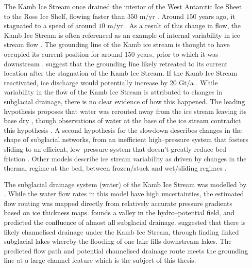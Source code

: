 The  Kamb Ice Stream  once  drained  the  interior  of  the  West  Antarctic  Ice  Sheet  to  the Ross Ice Shelf, flowing faster than $350$ $\mbox{m/yr}$ \citep{ng2004fast}.  Around $150$ years ago, it stagnated to a speed of around $10$ $\mbox{m/yr}$ \citep{ng2004fast}.   As  a  result  of  this  change  in  flow,  the  Kamb Ice Stream is  often referenced as an example of internal variability in ice stream flow \citep[e.g.][]{hulbe2004west}.  
The grounding line of the Kamb ice stream is thought to have occupied its current position for around 150 years, prior to which it was downstream \citep{fried2014grounding}. \cite{horgan2017poststagnation} suggest that the grounding line likely retreated to its current location after the stagnation of the Kamb Ice Stream.
If the Kamb Ice Stream reactivated, ice discharge would potentially increase by 20 Gt/a \citep{jacobel2009spatial}. 
While variability in the flow of the Kamb Ice Stream is attributed to changes in subglacial drainage, there is no clear evidence of how this happened. The leading hypothesis proposes that water was rerouted  away  from  the  ice  stream  leaving  its  base  dry \citep[e.g.][]{anandakrishnan1997stagnation}, though observations of water at the base of the ice stream contradict this hypothesis \citep{engelhardt1997basal}.  A second hypothesis for the slowdown describes changes in the shape of subglacial networks, from an inefficient high--pressure system that fosters sliding to an efficient, low--pressure system that doesn’t greatly reduce bed friction \citep{lelandais2018modelled,retzlaff1993timing}. Other models describe ice stream variability as driven by changes in the thermal regime at the bed, between frozen/stuck and wet/sliding regimes \cite[e.g.]{robel2013dynamics}.

The subglacial drainage system (water) of the Kamb Ice Stream was modelled by \cite{le2013evidence}. While the water flow rates in this model have high uncertainties, the estimated flow routing was mapped directly from relatively accurate pressure gradients based on ice thickness maps. \cite{le2013evidence} founds a valley in the hydro--potential field, and predicted the confluence of almost all subglacial drainage. \cite{kim2016active} suggested that there is likely channelised drainage under the Kamb Ice Stream, through finding linked subglacial lakes whereby the flooding of one lake fills downstream lakes.  The predicted flow path and potential channelised drainage route meets the grounding line at a large channel feature which is the subject of this thesis. 


